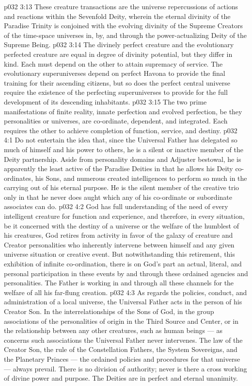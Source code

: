 \vs p032 3:13 These creature transactions are the universe repercussions of actions and reactions within the Sevenfold Deity, wherein the eternal divinity of the Paradise Trinity is conjoined with the evolving divinity of the Supreme Creators of the time\hyp{}space universes in, by, and through the power\hyp{}actualizing Deity of the Supreme Being.
\vs p032 3:14 The divinely perfect creature and the evolutionary perfected creature are equal in degree of divinity potential, but they differ in kind. Each must depend on the other to attain supremacy of service. The evolutionary superuniverses depend on perfect Havona to provide the final training for their ascending citizens, but so does the perfect central universe require the existence of the perfecting superuniverses to provide for the full development of its descending inhabitants.
\vs p032 3:15 The two prime manifestations of finite reality, innate perfection and evolved perfection, be they personalities or universes, are co\hyp{}ordinate, dependent, and integrated. Each requires the other to achieve completion of function, service, and destiny.
\vs p032 4:1 Do not entertain the idea that, since the Universal Father has delegated so much of himself and his power to others, he is a silent or inactive member of the Deity partnership. Aside from personality domains and Adjuster bestowal, he is apparently the least active of the Paradise Deities in that he allows his Deity co\hyp{}ordinates, his Sons, and numerous created intelligences to perform so much in the carrying out of his eternal purpose. He is the silent member of the creative trio only in that he never does aught which any of his co\hyp{}ordinate or subordinate associates can do.
\vs p032 4:2 God has full understanding of the need of every intelligent creature for function and experience, and therefore, in every situation, be it concerned with the destiny of a universe or the welfare of the humblest of his creatures, God retires from activity in favor of the galaxy of creature and Creator personalities who inherently intervene between himself and any given universe situation or creative event. But notwithstanding this retirement, this exhibition of infinite co\hyp{}ordination, there is on God’s part an actual, literal, and personal participation in these events by and through these ordained agencies and personalities. The Father is working in and through all these channels for the welfare of all his far\hyp{}flung creation.
\vs p032 4:3 \pc As regards the policies, conduct, and administration of a local universe, the Universal Father acts in the person of his Creator Son. In the interrelationships of the Sons of God, in the group associations of the personalities of origin in the Third Source and Center, or in the relationship between any other creatures, such as human beings --- as concerns such associations the Universal Father never intervenes. The law of the Creator Son, the rule of the Constellation Fathers, the System Sovereigns, and the Planetary Princes --- the ordained policies and procedures for that universe --- always prevail. There is no division of authority; never is there a cross working of divine power and purpose. The Deities are in perfect and eternal unanimity.

